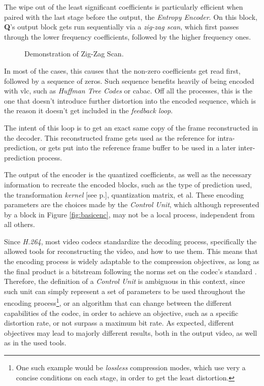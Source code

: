 The wipe out of the least significant coefficients is particularly efficient when paired with the last stage before the output, the \emph{Entropy Encoder}. On this block, \textbf{Q}'s output block gets run sequentially via a \emph{zig-zag scan}, which first passes through the lower frequency coefficients, followed by the higher frequency ones. 

\begin{figure}[!htbp]
    \centering
    
    \caption{Demonstration of Zig-Zag Scan.}
    \label{fig:zigzag}
\end{figure}

In most of the cases, this causes that the non-zero coefficients get read first, followed by a sequence of zeros. Such sequence benefits heavily of being encoded with \gls{vlc}, such as \emph{Huffman Tree Codes} or \Gls{cabac}. Off all the processes, this is the one that doesn't introduce further distortion into the encoded sequence, which is the reason it doesn't get included in the \emph{feedback loop}.

The intent of this loop is to get an exact same copy of the frame reconstructed in the decoder. This reconstructed frame gets used as the reference for intra-prediction, or gets put into the reference frame buffer to be used in a later inter-prediction process. 

The output of the encoder is the quantized coefficients, as well as the necessary information to recreate the encoded blocks, such as the type of prediction used, the transformation \emph{kernel} [see p.\pageref{par:kernel}], quantization matrix, et al. These encoding parameters are the choices made by the \emph{Control Unit}, which although represented by a block in Figure \ref{fig:basicenc}, may not be a local process, independent from all others. 

Since \emph{H.264}, most video codecs standardize the decoding process, specifically the allowed tools for reconstructing the video, and how to use them. This means that the encoding process is widely adaptable to the compression objectives, as long as the final product is a bitstream following the norms set on the codec's standard \cite{AV1BitstreamDecoding}. Therefore, the definition of a \emph{Control Unit} is ambiguous in this context, since such unit can simply represent a set of parameters to be used throughout the encoding process\footnote{One such example would be \emph{lossless} compression modes, which use very a concise conditions on each stage, in order to get the least distortion.}, or an algorithm that can change between the different capabilities of the codec, in order to achieve an objective, such as a specific distortion rate, or not surpass a maximum bit rate. As expected, different objectives may lead to majorly different results, both in the output video, as well as in the used tools.

